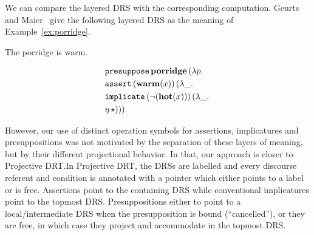We can compare the layered DRS with the corresponding computation. Geurts
and Maier~\cite{geurts2003layered} give the following layered DRS as the
meaning of Example~\ref{ex:porridge}.

\begin{exe}
  \ex The porridge is warm. \label{ex:porridge}
\end{exe}

\begin{minipage}{.4\textwidth}
\end{minipage}
\begin{minipage}{.4\textwidth}
  \vspace*{-4mm}
  \begin{center}
  \begin{align*}
    &\mathtt{presuppose}\,\textbf{porridge}\,(\lambda p.\,  \\
    &\mathtt{assert}\,(\textbf{warm}(x))\,(\lambda \_.\,  \\
    &\mathtt{implicate}\,(\lnot (\textbf{hot}(x)))\,(\lambda \_.\,  \\
    &\eta\,\star)))
  \end{align*}
  \end{center}
\end{minipage}

\vspace*{3mm}

However, our use of distinct operation symbols for assertions, implicatures
and presuppositions was not motivated by the separation of these layers of
meaning, but by their different projectional behavior. In that, our
approach is closer to Projective DRT.\@ In Projective DRT, the DRSs are
labelled and every discourse referent and condition is annotated with a
pointer which either points to a label or is free. Assertions point to the
containing DRS while conventional implicatures point to the topmost DRS.\@
Presuppositions either to point to a local/intermediate DRS when the
presupposition is bound (``cancelled''), or they are free, in which case
they project and accommodate in the topmost DRS.

